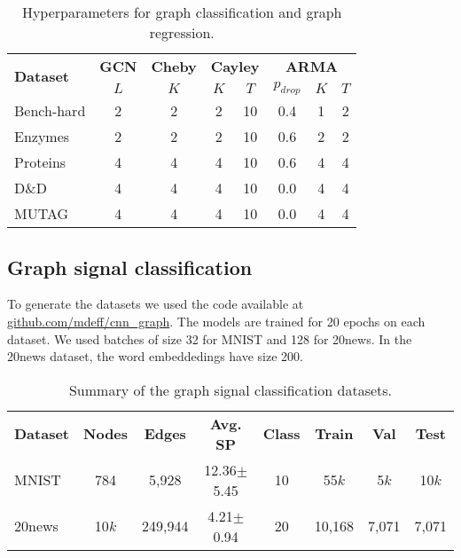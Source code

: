 \documentclass{article}
\begin{document}
\begin{table}[!ht]
\setlength\tabcolsep{.5em} \small
\centering
\caption{Hyperparameters for graph classification and graph regression.}
\bgroup
\def\arraystretch{1.0} \begin{tabular}{l|c|c|cc|ccc}
\cmidrule[1.5pt]{1-8}
\multirow{2}{*}{\textbf{Dataset}} & \textbf{GCN} & \textbf{Cheby} & \multicolumn{2}{c|}{\textbf{Cayley}} & \multicolumn{3}{c}{\textbf{ARMA}} \\
                                   & $L$ & $K$ & $K$ & $T$ & $p_{drop}$ & $K$ & $T$            \\
\midrule
Bench-hard  & 2 & 2 & 2 & 10 & 0.4 & 1 & 2 \\
Enzymes     & 2 & 2 & 2 & 10 & 0.6 & 2 & 2 \\
Proteins    & 4 & 4 & 4 & 10 & 0.6 & 4 & 4 \\  
D\&D        & 4 & 4 & 4 & 10 & 0.0 & 4 & 4 \\
MUTAG       & 4 & 4 & 4 & 10 & 0.0 & 4 & 4 \\
\cmidrule[1.5pt]{1-8}
\end{tabular}
\label{tab:hyper_gc}
\egroup
\end{table}


\subsection{Graph signal classification}

To generate the datasets we used the code available at \url{github.com/mdeff/cnn_graph}.
The models are trained for 20 epochs on each dataset. We used batches of size 32 for MNIST and 128 for 20news.
In the 20news dataset, the word embeddedings have size 200.

\begin{table}[!ht]
\setlength\tabcolsep{.15em} \small
\centering
\caption{Summary of the graph signal classification datasets.}
\bgroup
\def\arraystretch{1.1} \begin{tabular}{lccccccc}
\cmidrule[1.5pt]{1-8}
\textbf{Dataset} & \textbf{Nodes} & \textbf{Edges} & \textbf{Avg. SP} & \textbf{Class} & \textbf{Train} & \textbf{Val} & \textbf{Test} \\
\cmidrule[.5pt]{1-8}
MNIST    & 784    & 5,928    & 12.36\tiny{$\pm$5.45} & 10 & 55$k$ & 5$k$ & 10$k$ \\
20news   & 10$k$ & 249,944  & 4.21\tiny{$\pm$0.94}  & 20 & 10,168 & 7,071 & 7,071  \\
\cmidrule[1.5pt]{1-8}
\end{tabular}
\label{tab:stats_gsc}
\egroup
\end{table}
\end{document}
